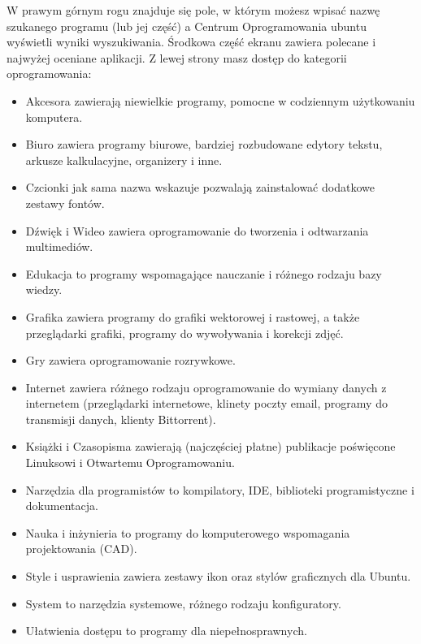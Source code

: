 W prawym górnym rogu znajduje się pole, w którym możesz wpisać nazwę szukanego programu (lub jej część) a Centrum Oprogramowania ubuntu wyświetli wyniki wyszukiwania. Środkowa część ekranu zawiera polecane i najwyżej oceniane aplikacji. Z lewej strony masz dostęp do kategorii oprogramowania:
\begin{itemize}
\item \textcolor{ubuntu_orange}{Akcesora} zawierają niewielkie programy, pomocne w codziennym użytkowaniu komputera.
\item \textcolor{ubuntu_orange}{Biuro} zawiera programy biurowe, bardziej rozbudowane edytory tekstu, arkusze kalkulacyjne, organizery i inne.
\item \textcolor{ubuntu_orange}{Czcionki} jak sama nazwa wskazuje pozwalają zainstalować dodatkowe zestawy fontów.
\item \textcolor{ubuntu_orange}{Dźwięk i Wideo} zawiera oprogramowanie do tworzenia i odtwarzania multimediów.
\item \textcolor{ubuntu_orange}{Edukacja} to programy wspomagające nauczanie i różnego rodzaju bazy wiedzy.
\item \textcolor{ubuntu_orange}{Grafika} zawiera programy do grafiki wektorowej i rastowej, a także przeglądarki grafiki, programy do wywoływania i korekcji zdjęć.
\item \textcolor{ubuntu_orange}{Gry} zawiera oprogramowanie rozrywkowe.
\item \textcolor{ubuntu_orange}{Internet} zawiera różnego rodzaju oprogramowanie do wymiany danych z internetem (przeglądarki internetowe, klinety poczty email, programy do transmisji danych, klienty Bittorrent).
\item \textcolor{ubuntu_orange}{Książki i Czasopisma} zawierają (najczęściej płatne) publikacje poświęcone Linuksowi i Otwartemu Oprogramowaniu.
\item \textcolor{ubuntu_orange}{Narzędzia dla programistów} to kompilatory, IDE, biblioteki programistyczne i dokumentacja.
\item \textcolor{ubuntu_orange}{Nauka i inżynieria} to programy do komputerowego wspomagania projektowania (CAD).
\item \textcolor{ubuntu_orange}{Style i usprawienia} zawiera zestawy ikon oraz stylów graficznych dla Ubuntu.
\item \textcolor{ubuntu_orange}{System} to narzędzia systemowe, różnego rodzaju konfiguratory.
\item \textcolor{ubuntu_orange}{Ułatwienia dostępu} to programy dla niepełnosprawnych.
\end{itemize}